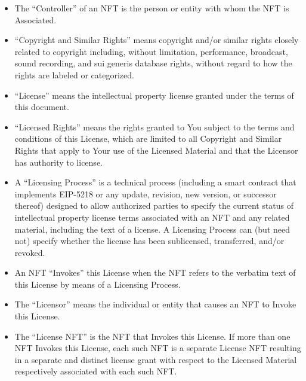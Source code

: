 \documentclass{article}
\newcommand{\eiplicense}{EIP-5218\xspace}
\newcommand{\subsect}[1]{\vspace{12pt}\noindent{\em{#1}}}
\begin{document}
\begin{sffamily}
\begin{itemize}
	\item The ``Controller'' of an NFT is the person or entity with whom the NFT is Associated.

	\end{itemize}

	\subsect{Licensing}

	\begin{itemize}	
	\item	``Copyright and Similar Rights'' means copyright and/or similar rights closely related to copyright including, without limitation, performance, broadcast, sound recording, and sui generis database rights, without regard to how the rights are labeled or categorized.

	\item	``License'' means the intellectual property license granted under the terms of this document.
		
	\item	``Licensed Rights'' means the rights granted to You subject to the terms and conditions of this License, which are limited to all Copyright and Similar Rights that apply to Your use of the Licensed Material and that the Licensor has authority to license.

	\item	A ``Licensing Process'' is a technical process (including a smart contract that implements \eiplicense or any update, revision, new version, or successor thereof) designed to allow authorized parties to specify the current status of intellectual property license terms associated with an NFT and any related material, including the text of a license. A Licensing Process can (but need not) specify whether the license has been sublicensed, transferred, and/or revoked.

	\item	An NFT ``Invokes'' this License when the NFT refers to the verbatim text of this License by means of a Licensing Process.
		
	\item	The ``Licensor'' means the individual or entity that causes an NFT to Invoke this License.
		
	\item	The ``License NFT'' is the NFT that Invokes this License. If more than one NFT Invokes this License, each such NFT is a separate License NFT resulting in a separate and distinct license grant with respect to the Licensed Material respectively associated with each such NFT.
		
	\end{itemize}
		

\end{sffamily}
\end{document}
